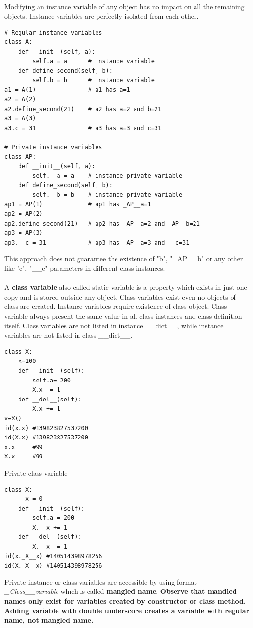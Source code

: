 \documentclass{article}
\begin{document}
\paragraph{}
Modifying an instance variable of any object has no impact on all the remaining objects. Instance variables are perfectly isolated from each other.
\begin{lstlisting}[style=pystyle]
# Regular instance variables
class A:
	def __init__(self, a):
		self.a = a		# instance variable
	def define_second(self, b):
		self.b = b		# instance variable
a1 = A(1)				# a1 has a=1
a2 = A(2)
a2.define_second(21)	# a2 has a=2 and b=21
a3 = A(3)
a3.c = 31				# a3 has a=3 and c=31

# Private instance variables
class AP:
	def __init__(self, a):
		self.__a = a	# instance private variable
	def define_second(self, b):
		self.__b = b	# instance private variable
ap1 = AP(1)				# ap1 has _AP__a=1
ap2 = AP(2)
ap2.define_second(21)	# ap2 has _AP__a=2 and _AP__b=21
ap3 = AP(3)
ap3.__c = 31			# ap3 has _AP__a=3 and __c=31
\end{lstlisting}
This approach does not guarantee the existence of "b", "\_AP\_\_b" or any other like "c", "\_\_c" parameters in different class instances.

\paragraph{}
A \textbf{class variable} also called static variable is a property which exists in just one copy and is stored outside any object. Class variables exist even no objects of class are created. Instance variables require existence of class object.
Class variable always present the same value in all class instances and class definition itself. Class variables are not listed in instance \_\_dict\_\_, while instance variables are not listed in class \_\_dict\_\_.
\begin{lstlisting}[style=pystyle]
class X:
    x=100
    def __init__(self):
        self.a= 200
        X.x -= 1
    def __del__(self):
        X.x += 1
x=X()
id(x.x)	#139823827537200
id(X.x)	#139823827537200
x.x		#99
X.x		#99
\end{lstlisting}
Private class variable
\begin{lstlisting}[style=pystyle]
class X:
    __x = 0
    def __init__(self):
        self.a = 200
        X.__x += 1
    def __del__(self):
        X.__x -= 1
id(x._X__x)	#140514398978256
id(X._X__x)	#140514398978256
\end{lstlisting}
Private instance or class variables are accessible by using format \textit{\_Class\_\_variable} which is called \textbf{mangled name}. \textbf{Observe that mandled names only exist for variables created by constructor or class method. Adding variable with double underscore creates a variable with regular name, not mangled name.}
\end{document}
